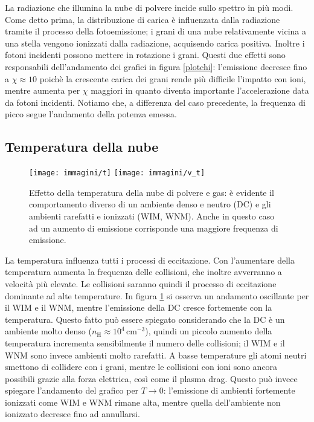 La radiazione che illumina la nube di polvere incide sullo spettro in più modi. Come detto prima, la distribuzione di carica è influenzata dalla radiazione tramite il processo della fotoemissione; i grani di una nube relativamente vicina a una stella vengono ionizzati dalla radiazione, acquisendo carica positiva. Inoltre i fotoni incidenti possono mettere in rotazione i grani. Questi due effetti sono responsabili dell'andamento dei grafici in figura \ref{plotchi}: l'emissione decresce fino a $\chi\approx10$ poichè la crescente carica dei grani rende più difficile l'impatto con ioni, mentre aumenta per $\chi$ maggiori in quanto diventa importante l'accelerazione data da fotoni incidenti.
Notiamo che, a differenza del caso precedente, la frequenza di picco segue l'andamento della potenza emessa.

\subsection{Temperatura della nube}
\begin{figure}
	
	\centerline{
		\centering
		\subfigure
		{\texttt{[image: immagini/t]}}
		\hspace{-5mm}
		\subfigure
		{\texttt{[image: immagini/v\_t]}}
	}
	\caption{Effetto della temperatura della nube di polvere e gas: è evidente il comportamento diverso di un ambiente denso e neutro (DC) e gli ambienti rarefatti e ionizzati (WIM, WNM). Anche in questo caso ad un aumento di emissione corrisponde una maggiore frequenza di emissione.}
	\label{plotT}
\end{figure}

La temperatura influenza tutti i processi di eccitazione. Con l'aumentare della temperatura aumenta la frequenza delle collisioni, che inoltre avverranno a velocità più elevate. Le collisioni saranno quindi il processo di eccitazione dominante ad alte temperature. In figura \ref{plotT} si osserva un andamento oscillante per il WIM e il WNM, mentre l'emissione della DC cresce fortemente con la temperatura. Questo fatto può essere spiegato considerando che la DC è un ambiente molto denso ($n_{\mathrm{H}}\approx10^4$\,cm$^{-3}$), quindi un piccolo aumento della temperatura incrementa sensibilmente il numero delle collisioni; il WIM e il WNM sono invece ambienti molto rarefatti. A basse temperature gli atomi neutri smettono di collidere con i grani, mentre le collisioni con ioni sono ancora possibili grazie alla forza elettrica, così come il plasma drag. Questo può invece spiegare l'andamento del grafico per $T\rightarrow0$: l'emissione di ambienti fortemente ionizzati come WIM e WNM rimane alta, mentre quella dell'ambiente non ionizzato decresce fino ad annullarsi.


